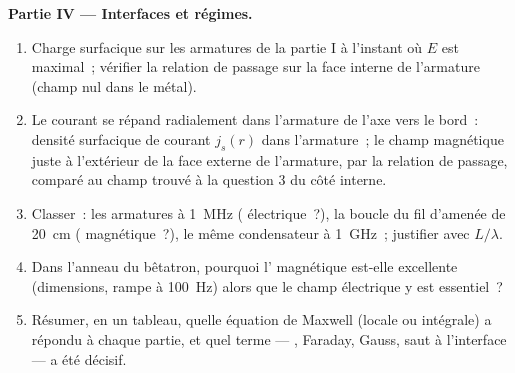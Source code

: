 \begin{problem}
\medskip
\noindent\textbf{Partie IV --- Interfaces et régimes.}
\begin{enumerate}[resume]
  \item Charge surfacique sur les armatures de la partie I à l'instant où
        $E$ est maximal~; vérifier la relation de passage sur la face interne de
        l'armature (champ nul dans le métal).
  \item Le courant se répand radialement dans l'armature de l'axe vers
        le bord~: densité surfacique de courant $j_s(r)$ dans l'armature~; le
        champ magnétique juste à l'extérieur de la face externe de l'armature, par la
        relation de passage, comparé au champ trouvé à la question 3
        du côté interne.
  \item Classer~: les armatures à \qty{1}{MHz} ( électrique~?), la boucle
        du fil d'amenée de \qty{20}{cm} ( magnétique~?), le même condensateur à
        \qty{1}{GHz}~; justifier avec $L/\lambda$.
  \item Dans l'anneau du bêtatron, pourquoi l'
        magnétique est-elle excellente (dimensions, rampe à \qty{100}{Hz}) alors que le
        champ électrique y est essentiel~?
  \item Résumer, en un tableau, quelle équation de Maxwell (locale ou
        intégrale) a répondu à chaque partie, et quel terme --- , Faraday, Gauss, saut à l'interface --- a été décisif.
\end{enumerate}
\end{problem}
